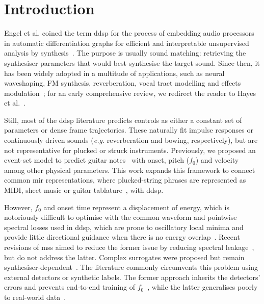 \documentclass[letterpaper]{article}
\begin{document}
\section{Introduction}
\glsresetall
Engel et al. coined the term \gls{ddsp} for the process of embedding audio processors in automatic differentiation graphs for efficient and interpretable unsupervised analysis by synthesis~\cite{engel2020ddsp}. The purpose is usually sound matching: retrieving the synthesiser parameters that would best synthesise the target sound. Since then, it has been widely adopted in a multitude of applications, such as neural waveshaping, FM synthesis, reverberation, vocal tract modelling and effects modulation~\cite{hayes2021waveshaping, caspe2022ddx7, dalsanto2023diffdn, sudholt2023vocal, yu2024torchlpc, mitcheltree2025modulation, carson2026gradient}; for an early comprehensive review, we redirect the reader to Hayes et al.~\cite{hayes2024review}.

Still, most of the \gls{ddsp} literature predicts controls as either a constant set of parameters or dense frame trajectories. These naturally fit impulse responses or continuously driven sounds (\textit{e.g.} reverberation and bowing, respectively), but are not representative for plucked or struck instruments. Previously, we proposed an event-set model to predict guitar notes~\cite{tablasdepaula2026karplus} with onset, pitch ($f_0$) and velocity among other physical parameters. This work expands this framework to connect common \gls{mir} representations, where plucked-string phrases are represented as MIDI, sheet music or guitar tablature~\cite{riley2024gaps,loth2025goat}, with \gls{ddsp}.

However, $f_0$ and onset time represent a displacement of energy, which is notoriously difficult to optimise with the common waveform and pointwise spectral losses used in \gls{ddsp}, which are prone to oscillatory local minima and provide little directional guidance when there is no energy overlap~\cite{wang2019nsf,turian2020loss}. Recent revisions of \gls{mss} aimed to reduce the former issue by reducing spectral leakage~\cite{schwar2023mss}, but do not address the latter. Complex surrogates were proposed but remain synthesiser-dependent~\cite{hayes2023sinusoidal}. The literature commonly circumvents this problem using external detectors or synthetic labels. The former approach inherits the detectors' errors and prevents end-to-end training of $f_0$~\cite{engel2020inverse,engel2020ddsp,caspe2022ddx7,sudholt2023vocal}, while the latter generalises poorly to real-world data~\cite{tablasdepaula2026karplus}.
\end{document}
